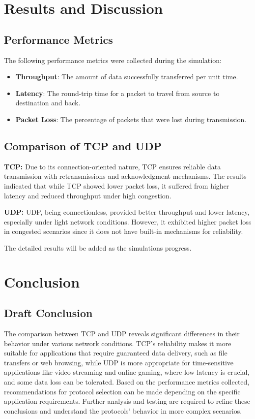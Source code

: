 \documentclass[a4paper,12pt]{article}
\begin{document}
	\section{Results and Discussion}
	\subsection{Performance Metrics}
	The following performance metrics were collected during the simulation:
	\begin{itemize}
		\item \textbf{Throughput}: The amount of data successfully transferred per unit time.
		\item \textbf{Latency}: The round-trip time for a packet to travel from source to destination and back.
		\item \textbf{Packet Loss}: The percentage of packets that were lost during transmission.
	\end{itemize}
	
	\subsection{Comparison of TCP and UDP}
	\textbf{TCP:} Due to its connection-oriented nature, TCP ensures reliable data transmission with retransmissions and acknowledgment mechanisms. The results indicated that while TCP showed lower packet loss, it suffered from higher latency and reduced throughput under high congestion.
	
	\textbf{UDP:} UDP, being connectionless, provided better throughput and lower latency, especially under light network conditions. However, it exhibited higher packet loss in congested scenarios since it does not have built-in mechanisms for reliability.
	
	The detailed results will be added as the simulations progress.
	
	\section{Conclusion}
	\subsection{Draft Conclusion}
	The comparison between TCP and UDP reveals significant differences in their behavior under various network conditions. TCP’s reliability makes it more suitable for applications that require guaranteed data delivery, such as file transfers or web browsing, while UDP is more appropriate for time-sensitive applications like video streaming and online gaming, where low latency is crucial, and some data loss can be tolerated. Based on the performance metrics collected, recommendations for protocol selection can be made depending on the specific application requirements. Further analysis and testing are required to refine these conclusions and understand the protocols’ behavior in more complex scenarios.
	
\end{document}
